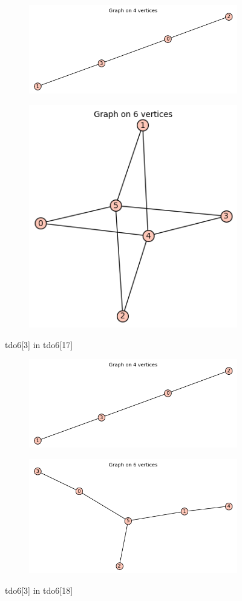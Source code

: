 \documentclass[12pt, a4paper]{article}
\begin{document}
\begin{center}
\begin{figure}[!htb]
\centering
\begin{subfigure}{0.5\textwidth}
  \centering
  \includegraphics[width=0.6\linewidth]{tdo6[3]}
\end{subfigure}%
\begin{subfigure}{0.5\textwidth}
  \centering
  \includegraphics[width=0.5\linewidth]{tdo6[17]}
\end{subfigure}
\caption{tdo6[3] in tdo6[17]}
\label{fig:test}
\end{figure}

\begin{figure}[!htb]
\centering
\begin{subfigure}{0.5\textwidth}
  \centering
  \includegraphics[width=0.6\linewidth]{tdo6[3]}
\end{subfigure}%
\begin{subfigure}{0.5\textwidth}
  \centering
  \includegraphics[width=0.6\linewidth]{tdo6[18]}
\end{subfigure}
\caption{tdo6[3] in tdo6[18]}
\label{fig:test}
\end{figure}


\end{center}
\end{document}
